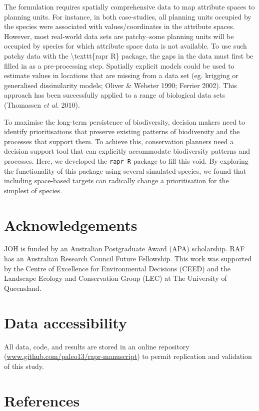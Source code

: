\documentclass[11pt,]{article}
\begin{document}
The formulation requires spatially comprehensive data to map attribute
spaces to planning units. For instance, in both case-studies, all
planning units occupied by the species were associated with
values/coordinates in the attribute spaces. However, most real-world
data sets are patchy--some planning units will be occupied by species
for which attribute space data is not available. To use such patchy data
with the \textbackslash{}texttt\{rapr R\} package, the gaps in the data
must first be filled in as a pre-processing step. Spatially explicit
models could be used to estimate values in locations that are missing
from a data set (eg. krigging or generalised dissimilarity models;
Oliver \& Webster 1990; Ferrier 2002). This approach has been
successfully applied to a range of biological data sets (Thomassen
\emph{et al.} 2010).

To maximise the long-term persistence of biodiversity, decision makers
need to identify prioritisations that preserve existing patterns of
biodiversity and the processes that support them. To achieve this,
conservation planners need a decision support tool that can explicitly
accommodate biodiversity patterns and processes. Here, we developed the
\texttt{rapr R} package to fill this void. By exploring the
functionality of this package using several simulated species, we found
that including space-based targets can radically change a prioritisation
for the simplest of species.

\section{Acknowledgements}\label{acknowledgements}

JOH is funded by an Australian Postgraduate Award (APA) scholarship. RAF
has an Australian Research Council Future Fellowship. This work was
supported by the Centre of Excellence for Environmental Decisions (CEED)
and the Landscape Ecology and Conservation Group (LEC) at The University
of Queensland.

\section{Data accessibility}\label{data-accessibility}

All data, code, and results are stored in an online repository
(\url{www.github.com/paleo13/rapr-manuscript}) to permit replication and
validation of this study.

\section{References}\label{references}
\end{document}
